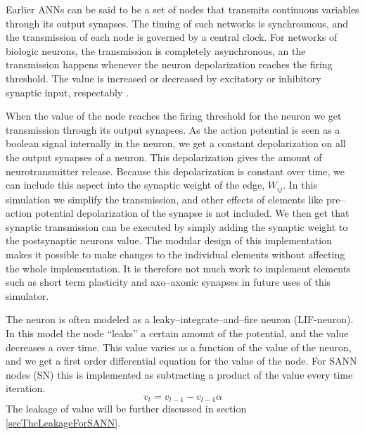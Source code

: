	Earlier ANNs can be said to be a set of nodes that transmits continuous variables through its output synapses. The timing of such networks is synchrounous, and the transmission of each node is governed by a central clock.
	For networks of biologic neurons, the transmission is completely asynchronous, an the transmission happens whenever the neuron depolarization reaches the firing threshold.
	The value is increased or decreased by excitatory or inhibitory synaptic input, respectably .
	
	When the value of the node reaches the firing threshold for the neuron we get transmission through its output synapses.
	As the action potential is seen as a boolean signal internally in the neuron, we get a constant depolarization on all the output synapses of a neuron.
	This depolarization gives the amount of neurotransmitter release. 
	Because this depolarization is constant over time, we can include this aspect into the synaptic weight of the edge, $W_{ij}$.
	In this simulation we simplify the transmission, and other effects of elements like pre--action potential depolarization of the synapse is not included.%
	We then get that synaptic transmission can be executed by simply adding the synaptic weight to the postsynaptic neurons value.
	The modular design of this implementation makes it possible to make changes to the individual elements without affecting the whole implementation.
	It is therefore not much work to implement elements such as short term plasticity and axo--axonic synapses in future uses of this simulator.

	The neuron is often modeled as a leaky--integrate--and--fire neuron (LIF-neuron). %
	In this model the node ``leaks'' a certain amount of the potential, and the value decreases a over time. 
	This value varies as a function of the value of the neuron, and we get a first order differential equation for the value of the node.
	For SANN nodes (SN) this is implemented as subtracting a product of the value every time iteration. 
	\begin{equation}
	v_t = v_{t-1} - v_{t-1}  \alpha %
	\end{equation}
	The leakage of value will be further discussed in section \ref{secTheLeakageForSANN}.

